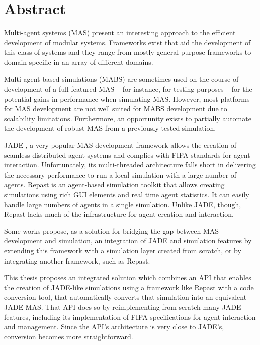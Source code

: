 \chapter*{Abstract}

Multi-agent systems (MAS) present an interesting approach to the efficient development of modular systems. Frameworks exist that aid the development of this class of systems and they range from mostly general-purpose frameworks to domain-specific in an array of different domains.

Multi-agent-based simulations (MABS) are sometimes used on the course of development of a full-featured MAS -- for instance, for testing purposes -- for the potential gains in performance when simulating MAS. 
However, most platforms for MAS development are not well suited for MABS development due to scalability limitations\cite{mengistu2008scalability}. Furthermore, an opportunity exists to partially automate the development of robust MAS from a previously tested simulation.

JADE \cite{bellifemine2007developing}, a very popular MAS development framework allows the creation of seamless distributed agent systems and complies with FIPA standards for agent interaction. Unfortunately, its multi-threaded architecture falls short in delivering the necessary performance to run a local simulation with a large number of agents. Repast \cite{collier2003repast} is an agent-based simulation toolkit that allows creating simulations using rich GUI elements and real time agent statistics. It can easily handle large numbers of agents in a single simulation. Unlike JADE, though, Repast lacks much of the infrastructure for agent creation and interaction.

Some works \cite{garcia2011misia,gormer2011jrep} propose, as a solution for bridging the gap between MAS development and simulation, an integration of JADE and simulation features by extending this framework with a simulation layer created from scratch, or by integrating another framework, such as Repast.

This thesis proposes an integrated solution which combines an API that enables the creation of JADE-like simulations using a framework like Repast with a code conversion tool, that automatically converts that simulation into an equivalent JADE MAS. That API does so by reimplementing from scratch many JADE features, including its implementation of FIPA specifications for agent interaction and management. Since the API's architecture is very close to JADE's, conversion becomes more straightforward.

